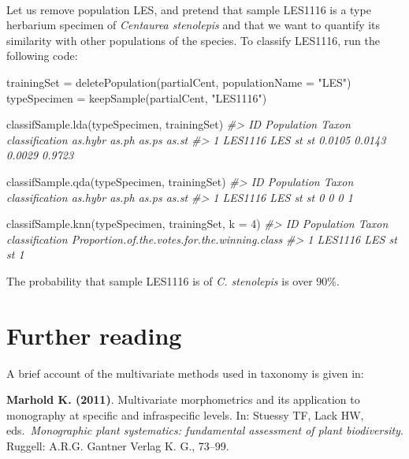 \documentclass[
  11pt,
  a4paper]{article}
\newenvironment{Shaded}{\begin{snugshade}}{\end{snugshade}}
\newcommand{\AttributeTok}[1]{\textcolor[rgb]{0.77,0.63,0.00}{#1}}
\newcommand{\CommentTok}[1]{\textcolor[rgb]{0.56,0.35,0.01}{\textit{#1}}}
\newcommand{\DecValTok}[1]{\textcolor[rgb]{0.00,0.00,0.81}{#1}}
\newcommand{\FunctionTok}[1]{\textcolor[rgb]{0.00,0.00,0.00}{#1}}
\newcommand{\NormalTok}[1]{#1}
\newcommand{\OtherTok}[1]{\textcolor[rgb]{0.56,0.35,0.01}{#1}}
\newcommand{\StringTok}[1]{\textcolor[rgb]{0.31,0.60,0.02}{#1}}
\begin{document}
~

Let us remove population LES, and pretend that sample LES1116 is a type
herbarium specimen of \emph{Centaurea stenolepis} and that we want to
quantify its similarity with other populations of the species. To
classify LES1116, run the following code:

\begin{Shaded}
\begin{Highlighting}[]
\NormalTok{trainingSet }\OtherTok{=} \FunctionTok{deletePopulation}\NormalTok{(partialCent, }\AttributeTok{populationName =} \StringTok{"LES"}\NormalTok{)}
\NormalTok{typeSpecimen }\OtherTok{=} \FunctionTok{keepSample}\NormalTok{(partialCent, }\StringTok{"LES1116"}\NormalTok{)}

\FunctionTok{classifSample.lda}\NormalTok{(typeSpecimen, trainingSet)}
\CommentTok{\#\textgreater{}        ID Population Taxon classification as.hybr  as.ph  as.ps  as.st}
\CommentTok{\#\textgreater{} 1 LES1116        LES    st             st  0.0105 0.0143 0.0029 0.9723}

\FunctionTok{classifSample.qda}\NormalTok{(typeSpecimen, trainingSet)}
\CommentTok{\#\textgreater{}        ID Population Taxon classification as.hybr as.ph as.ps as.st}
\CommentTok{\#\textgreater{} 1 LES1116        LES    st             st       0     0     0     1}

\FunctionTok{classifSample.knn}\NormalTok{(typeSpecimen, trainingSet, }\AttributeTok{k =} \DecValTok{4}\NormalTok{)}
\CommentTok{\#\textgreater{}        ID Population Taxon classification Proportion.of.the.votes.for.the.winning.class}
\CommentTok{\#\textgreater{} 1 LES1116        LES    st             st                                             1}
\end{Highlighting}
\end{Shaded}

The probability that sample LES1116 is of \emph{C. stenolepis} is over
90\%.

\newpage

\hypertarget{further-reading}{%
\section{Further reading}\label{further-reading}}

A brief account of the multivariate methods used in taxonomy is given
in:

\textbf{Marhold K. (2011)}. Multivariate morphometrics and its
application to monography at specific and infraspecific levels. In:
Stuessy TF, Lack HW, eds.~\emph{Monographic plant systematics:
fundamental assessment of plant biodiversity}. Ruggell: A.R.G. Gantner
Verlag K. G., 73--99.
\end{document}
